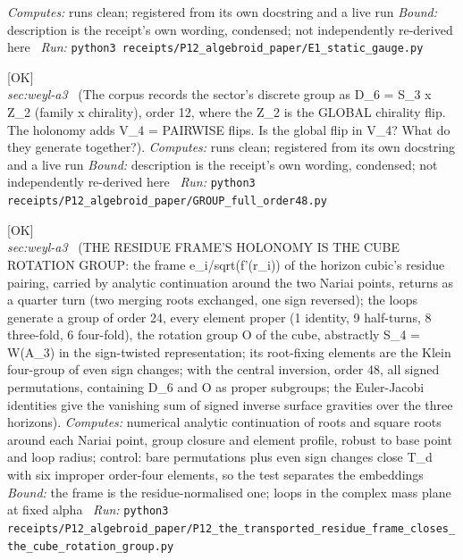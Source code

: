 \begin{description}
\emph{Computes:} runs clean; registered from its own docstring and a live run
 \emph{Bound:} description is the receipt's own wording, condensed; not independently re-derived here
\ \emph{Run:} \texttt{python3 receipts/P12\_algebroid\_paper/E1\_static\_gauge.py}
\item[\rcptlabel{GROUP_full_order48}{P12R4}\textbf{P12R4}\quad\texttt{GROUP\_full\_order48}]\hfill\textsf{[OK]}\\
\textit{sec:weyl-a3} \ (The corpus records the sector's discrete group as D\_6 = S\_3 x Z\_2 (family x chirality), order 12, where the Z\_2 is the GLOBAL chirality flip. The holonomy adds V\_4 = PAIRWISE flips. Is the global flip in V\_4? What do they generate together?). 
\emph{Computes:} runs clean; registered from its own docstring and a live run
 \emph{Bound:} description is the receipt's own wording, condensed; not independently re-derived here
\ \emph{Run:} \texttt{python3 receipts/P12\_algebroid\_paper/GROUP\_full\_order48.py}
\item[\rcptlabel{P12_the_transported_residue_frame_closes_the_cube_rotation_group}{P12R5}\textbf{P12R5}\quad\texttt{P12\_the\_transported\_residue\_frame\_closes\_the\_cube\_rotation\_group}]\hfill\textsf{[OK]}\\
\textit{sec:weyl-a3} \ (THE RESIDUE FRAME'S HOLONOMY IS THE CUBE ROTATION GROUP: the frame e\_i/sqrt(f'(r\_i)) of the horizon cubic's residue pairing, carried by analytic continuation around the two Nariai points, returns as a quarter turn (two merging roots exchanged, one sign reversed); the loops generate a group of order 24, every element proper (1 identity, 9 half-turns, 8 three-fold, 6 four-fold), the rotation group O of the cube, abstractly S\_4 = W(A\_3) in the sign-twisted representation; its root-fixing elements are the Klein four-group of even sign changes; with the central inversion, order 48, all signed permutations, containing D\_6 and O as proper subgroups; the Euler-Jacobi identities give the vanishing sum of signed inverse surface gravities over the three horizons). 
\emph{Computes:} numerical analytic continuation of roots and square roots around each Nariai point, group closure and element profile, robust to base point and loop radius; control: bare permutations plus even sign changes close T\_d with six improper order-four elements, so the test separates the embeddings
 \emph{Bound:} the frame is the residue-normalised one; loops in the complex mass plane at fixed alpha
\ \emph{Run:} \texttt{python3 receipts/P12\_algebroid\_paper/P12\_the\_transported\_residue\_frame\_closes\_the\_cube\_rotation\_group.py}

\end{description}
